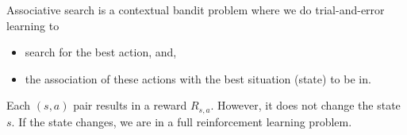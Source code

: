 Associative search is a contextual bandit problem where we do trial-and-error learning to
\begin{itemize}
    \item  search for the best action, and,
    \item the association of these actions with the best situation (state) to be in.
\end{itemize}

Each $(s,a)$ pair results in a reward $R_{s,a}$. However, it does not change the state $s$.
If the state changes, we are in a full reinforcement learning problem.
